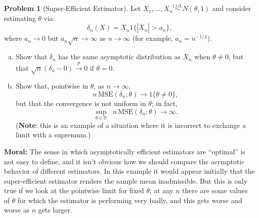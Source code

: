\documentclass{article}
\newcommand{\RR}{\mathbb{R}}
\newcommand{\toProb}{\overset{p}{\to}}
\newcommand{\simiid}{\overset{\text{i.i.d.}}{\sim}}
\theoremstyle{definition}
\newtheorem{problem}{Problem}
\begin{document}
\begin{problem}[Super-Efficient Estimator]

Let $X_1,\ldots,X_n \simiid N(\theta,1)$ and consider estimating $\theta$ via:
\[
\delta_n(X) = \overline{X}_n 1\{|\overline{X}_n| > a_n\},
\]
where $a_n \to 0$ but $a_n\sqrt{n} \to \infty$ as $n \to \infty$ (for example, $a_n = n^{-1/4}$).

\begin{enumerate}[(a)]
\item Show that $\delta_n$ has the same asymptotic distribution as $\overline X_n$ when $\theta \neq 0$, but that $\sqrt{n}(\delta_n-0)\toProb 0$ if $\theta = 0$.



\item Show that, pointwise in $\theta$, as $n\to\infty$,
\[
n\,\text{MSE}(\delta_n;\theta) \to 1\{\theta\neq 0\},
\]
but that the convergence is not uniform in $\theta$; in fact,
\[
\sup_{\theta\in\RR}\;\; n\,\text{MSE}(\delta_n;\theta) \rightarrow \infty.
\]
({\bf Note}: this is an example of a situation where it is incorrect to exchange a limit with a supremum.)



\end{enumerate}

{\bf Moral:} The sense in which asymptotically efficient estimators are ``optimal'' is not easy to define, and it isn't obvious how we should compare the asymptotic behavior of different estimators. In this example it would appear initially that the super-efficient estimator renders the sample mean inadmissible. But this is only true if we look at the pointwise limit for fixed $\theta$; at any $n$ there are some values of $\theta$ for which the estimator is performing very badly, and this gets worse and worse as $n$ gets larger.

\end{problem}




\end{document}
